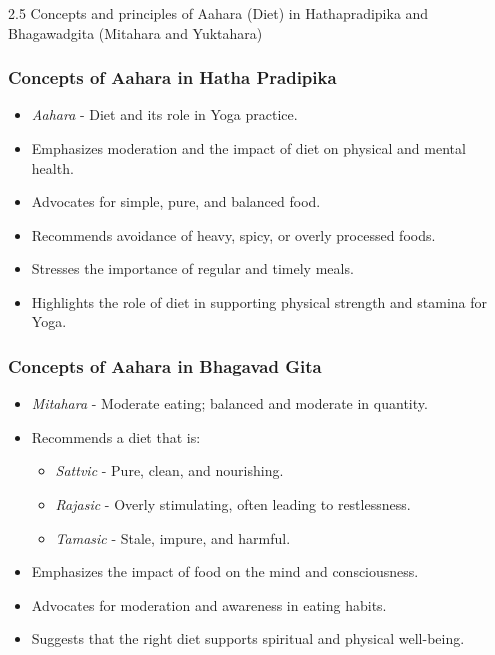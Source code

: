 \begin{frame}[fragile]\frametitle{}
\begin{center}
{\Large 2.5  Concepts  and  principles  of  Aahara  (Diet)  in  Hathapradipika  and  Bhagawadgita  (Mitahara and Yuktahara)}
\end{center}
\end{frame}

\begin{frame}[fragile]\frametitle{Concepts of Aahara in Hatha Pradipika}

      \begin{itemize}
		\item \textit{Aahara} - Diet and its role in Yoga practice.
		\item Emphasizes moderation and the impact of diet on physical and mental health.
		\item Advocates for simple, pure, and balanced food.
		\item Recommends avoidance of heavy, spicy, or overly processed foods.
		\item Stresses the importance of regular and timely meals.
		\item Highlights the role of diet in supporting physical strength and stamina for Yoga.
	  \end{itemize}

\end{frame}

\begin{frame}[fragile]\frametitle{Concepts of Aahara in Bhagavad Gita}

      \begin{itemize}
		\item \textit{Mitahara} - Moderate eating; balanced and moderate in quantity.
		\item Recommends a diet that is:
		  \begin{itemize}
		      \item \textit{Sattvic} - Pure, clean, and nourishing.
		      \item \textit{Rajasic} - Overly stimulating, often leading to restlessness.
		      \item \textit{Tamasic} - Stale, impure, and harmful.
		  \end{itemize}
		\item Emphasizes the impact of food on the mind and consciousness.
		\item Advocates for moderation and awareness in eating habits.
		\item Suggests that the right diet supports spiritual and physical well-being.
	  \end{itemize}

\end{frame}

